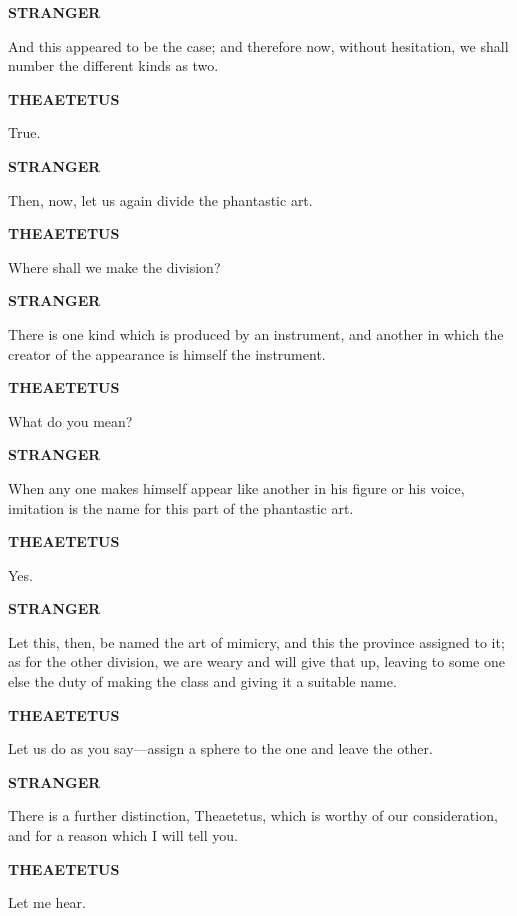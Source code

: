 \documentclass[11pt,letter]{article}
\begin{document}
\par \textbf{STRANGER}
\par   And this appeared to be the case; and therefore now, without hesitation, we shall number the different kinds as two.

\par \textbf{THEAETETUS}
\par   True.

\par \textbf{STRANGER}
\par   Then, now, let us again divide the phantastic art.

\par \textbf{THEAETETUS}
\par   Where shall we make the division?

\par \textbf{STRANGER}
\par   There is one kind which is produced by an instrument, and another in which the creator of the appearance is himself the instrument.

\par \textbf{THEAETETUS}
\par   What do you mean?

\par \textbf{STRANGER}
\par   When any one makes himself appear like another in his figure or his voice, imitation is the name for this part of the phantastic art.

\par \textbf{THEAETETUS}
\par   Yes.

\par \textbf{STRANGER}
\par   Let this, then, be named the art of mimicry, and this the province assigned to it; as for the other division, we are weary and will give that up, leaving to some one else the duty of making the class and giving it a suitable name.

\par \textbf{THEAETETUS}
\par   Let us do as you say—assign a sphere to the one and leave the other.

\par \textbf{STRANGER}
\par   There is a further distinction, Theaetetus, which is worthy of our consideration, and for a reason which I will tell you.

\par \textbf{THEAETETUS}
\par   Let me hear.
\end{document}
